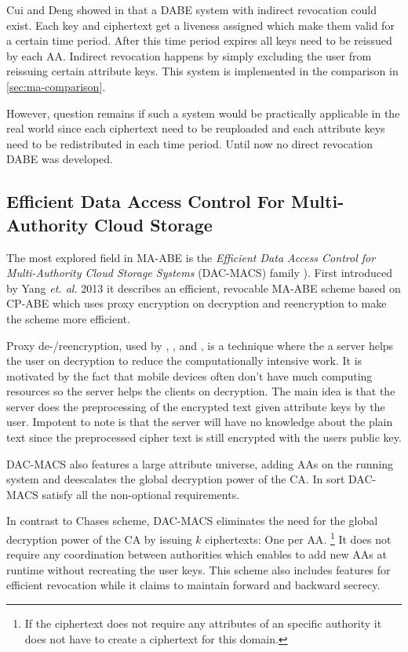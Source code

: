 Cui and Deng showed in \cite{cui2016revocable} that a DABE system with indirect revocation could exist. Each key and ciphertext get a liveness assigned which make them valid for a certain time period. After this time period expires all keys need to be reissued by each \ac{AA}. Indirect revocation happens by simply excluding the user from reissuing certain attribute keys. This system is implemented in the comparison in \ref{sec:ma-comparison}.

However, question remains if such a system would be practically applicable in the real world since each ciphertext need to be reuploaded and each attribute keys need to be redistributed in each time period. Until now no direct revocation DABE was developed.

\subsection{Efficient Data Access Control For Multi-Authority Cloud Storage}
The most explored field in \ac{MA-ABE} is the \textit{Efficient Data Access Control for Multi-Authority Cloud Storage Systems} (\ac{DAC-MACS}) family \cite{yang2013dac}). First introduced by Yang \textit{et. al.} 2013 it describes an efficient, revocable \ac{MA-ABE} scheme based on \ac{CP-ABE} which uses proxy encryption on decryption and reencryption to make the scheme more efficient. 

Proxy de-/reencryption, used by \cite{yang2013dac}, \cite{wu2017security}, \cite{li2017two} and \cite{wang2011hierarchical}, is a technique where the a server helps the user on decryption to reduce the computationally intensive work. It is motivated by the fact that mobile devices often don't have much computing resources so the server helps the clients on decryption. The main idea is that the server does the preprocessing of the encrypted text given attribute keys by the user. Impotent to note is that the server will have no knowledge about the plain text since the preprocessed cipher text is still encrypted with the users public key.

DAC-MACS also features a large attribute universe, adding \ac{AA}s on the running system and deescalates the global decryption power of the \ac{CA}. In sort \ac{DAC-MACS} satisfy all the non-optional requirements.

In contrast to Chases scheme, DAC-MACS eliminates the need for the global decryption power of the \ac{CA} by issuing $k$ ciphertexts: One per \ac{AA}. \footnote{If the ciphertext does not require any attributes of an specific authority it does not have to create a ciphertext for this domain.} It does not require any coordination between authorities which enables to add new \ac{AA}s at runtime without recreating the user keys. This scheme also includes features for efficient revocation while it claims to maintain forward and backward secrecy.

